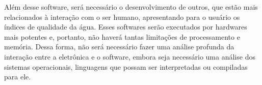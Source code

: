 Além desse software, será necessário o desenvolvimento de outros, que estão mais relacionados à interação com o ser
humano, apresentando para o usuário os índices de qualidade da água. Esses softwares serão executados por hardwares
mais potentes e,  portanto, não haverá tantas limitações de processamento e memória. Dessa forma, não será necessário
fazer uma análise profunda da interação entre a eletrônica e o software, embora seja necessário uma análise dos 
sistemas operacionais, linguagens que possam ser interpretadas ou compiladas para ele.